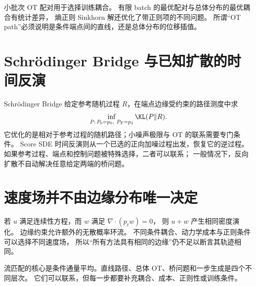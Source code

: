 小批次 OT 配对用于选择训练耦合。
有限 batch 的最优配对与总体分布的最优耦合有统计差异，
熵正则 Sinkhorn 解还优化了带正则项的不同问题。
所谓“OT path”必须说明是条件端点间的直线，还是总体分布的位移插值。

\section{Schrödinger Bridge 与已知扩散的时间反演}

Schrödinger Bridge 给定参考随机过程 $R$，在端点边缘受约束的路径测度中求
\[
\inf_{P:\,P_0=p_0,\ P_T=p_1}\KL(P\Vert R).
\]
它优化的是相对于参考过程的随机路径；小噪声极限与 OT 的联系需要专门条件。
Score SDE 时间反演则从一个已选的正向加噪过程出发，恢复它的逆过程。
如果参考过程、端点和控制问题被特殊选择，二者可以联系；
一般情况下，反向扩散不自动解决任意给定两端的桥问题。

\section{速度场并不由边缘分布唯一决定}

若 $u$ 满足连续性方程，而 $w$ 满足 $\nabla\cdot(p_tw)=0$，
则 $u+w$ 产生相同密度演化。
边缘约束允许额外的无散概率环流。
不同条件耦合、动力学成本与正则条件可以选择不同速度场，
所以“所有方法具有相同的边缘”仍不足以断言其轨迹相同。

\begin{theorytakeaway}
流匹配的核心是条件通量平均。直线路径、总体 OT、桥问题和一步生成是四个不同层次。
它们可以联系，但每一步都要补充耦合、成本、正则性或训练条件。
\end{theorytakeaway}
